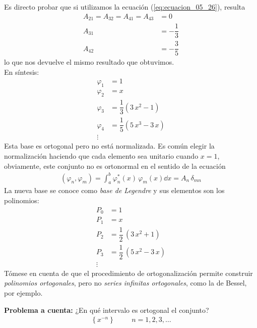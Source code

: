 Es directo probar que si utilizamos la ecuación (\ref{eq:ecuacion_05_26}), resulta
\begin{align*}
A_{21} = A_{32} = A_{41} = A_{43} &= 0 \\
A_{31} &= - \dfrac{1}{3} \\
A_{42} &= - \dfrac{3}{5}
\end{align*}
lo que nos devuelve el mismo resultado que obtuvimos.
\\
En síntesis:
\begin{align*}
\varphi_{1} &= 1 \\
\varphi_{2} &= x \\
\varphi_{3} &= \dfrac{1}{3} (3 \, x^{2} - 1) \\
\varphi_{4} &= \dfrac{1}{5} (5 \, x^{3} - 3 \, x) \\
\vdots
\end{align*}
Esta base es ortogonal pero no está normalizada. Es común elegir la normalización haciendo que cada elemento sea unitario cuando $x=1$, obviamente, este conjunto no es ortonormal en el sentido de la ecuación
\begin{align*}
(\varphi_{n}, \varphi_{m}) = \int_{a}^{b} \varphi_{n}^{*} (x) \, \varphi_{m} (x) \dd{x} = A_{n} \, \delta_{mn}
\end{align*}
La nueva base se conoce como \emph{base de Legendre} y sus elementos son los polinomios:
\begin{align*}
P_{0} &= 1 \\
P_{1} &= x \\
P_{2} &= \dfrac{1}{2} \, (3 \, x^{2} + 1) \\
P_{3} &= \dfrac{1}{2} \, (5 \, x^{2} - 3 \, x) \\
\vdots
\end{align*}
Tómese en cuenta de que el procedimiento de ortogonalización permite construir \emph{polinomios ortogonales}, pero no \emph{series infinitas ortogonales}, como la de Bessel, por ejemplo.
\par
\textbf{Problema a cuenta: } ¿En qué intervalo es ortogonal el conjunto?
\begin{align*}
\left\{ x^{-n} \right\} \hspace{1cm} n = 1, 2, 3, \ldots
\end{align*}
